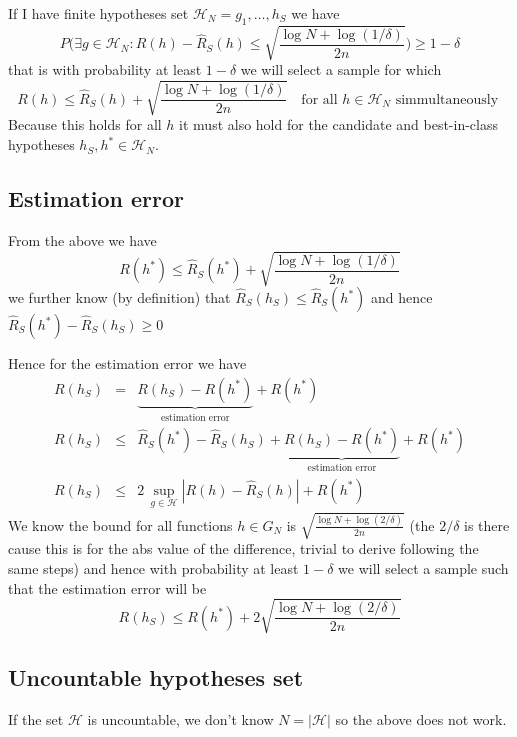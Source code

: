 If I have finite hypotheses set $\mathcal{H}_N = {g_1, \ldots, h_S}$ we have
\begin{equation}
P \Big( \exists g \in \mathcal{H}_N: R(h) - \widehat{R}_S(h)  \leq \sqrt{\frac{\log N + \log (1/ \delta)}{2n}} \Big) \geq 1 - \delta
\end{equation}
that is with probability at least $1-\delta$ we will select a sample for which
\begin{equation}
R(h)  \leq \widehat{R}_S(h) + \sqrt{\frac{\log N + \log (1/ \delta)}{2n}} \quad \text{for all } h \in \mathcal{H}_N \text{ simmultaneously }
\end{equation}
Because this holds for all $h$ it must also hold for the candidate and best-in-class hypotheses $h_S, h^* \in \mathcal{H}_N$.

\subsection{Estimation error}
From the above we have
\begin{equation}
R(h^*)  \leq \widehat{R}_S(h^*) + \sqrt{\frac{\log N + \log (1/ \delta)}{2n}}
\end{equation}
we further know (by definition) that $\widehat{R}_S(h_S) \leq \widehat{R}_S(h^*)$ and hence $\widehat{R}_S(h^*) - \widehat{R}_S(h_S) \geq 0$

Hence for the estimation error we have
\begin{eqnarray}
R(h_S) & = & \underbrace{R(h_S) - R(h^*)}_{\text{estimation error}} + R(h^*) \\
R(h_S) & \leq & \widehat{R}_S(h^*) - \widehat{R}_S(h_S) + \underbrace{R(h_S) - R(h^*)}_{\text{estimation error}} + R(h^*) \\
R(h_S) & \leq & 2 \, \sup_{g \in \mathcal{H}} |R(h) - \widehat{R}_S(h)| + R(h^*)
\end{eqnarray}
We know the bound for all functions $h \in {G}_N$ is $\sqrt{\frac{\log N + \log (2/ \delta)}{2n}}$ (the $2/\delta$ is there cause this is for the abs value of the difference, trivial to derive following the same steps) and hence with probability at least $1-\delta$ we will select a sample such that the estimation error will be
\begin{equation}
R(h_S) \leq R(h^*) + 2 \sqrt{\frac{\log N + \log (2/ \delta)}{2n}}
\end{equation}

\subsection{Uncountable hypotheses set}
If the set $\mathcal{H}$ is uncountable, we don't know $N = |\mathcal{H}|$ so the above does not work.

